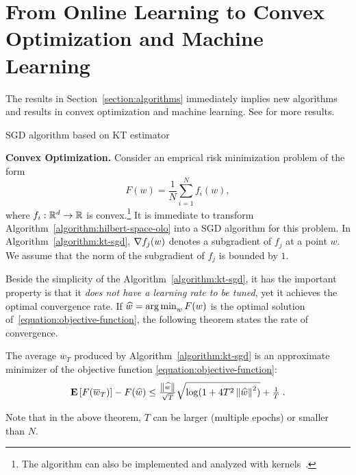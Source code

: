 \section{From Online Learning to Convex Optimization and Machine Learning}
\label{section:applications}

The results in Section~\ref{section:algorithms} immediately implies new
algorithms and results in convex optimization and machine learning. See
\cite{Orabona-2014} for more results.

\begin{algorithm}[t]
\caption{SGD algorithm based on KT estimator \label{algorithm:kt-sgd}}
\begin{algorithmic}[1]
{
\ENDFOR
{}
}
\end{algorithmic}
\end{algorithm}

\textbf{Convex Optimization.}
Consider an emprical risk minimization problem of the form
%
\begin{equation}
\label{equation:objective-function}
F(w) = \frac{1}{N} \sum_{i=1}^N f_i(w),
\end{equation}
%
where $f_i:\mathbb{R}^d \to \mathbb{R}$ is convex.\footnote{The algorithm can also be
implemented and analyzed with kernels~\citep{Orabona-2014}.} It is immediate to
transform Algorithm~\ref{algorithm:hilbert-space-olo} into a \ac{SGD} algorithm
for this problem. In Algorithm~\ref{algorithm:kt-sgd}, $\nabla f_j(w)$
denotes a subgradient of $f_j$ at a point $w$.  We assume that the
norm of the subgradient of $f_j$ is bounded by $1$.

Beside the simplicity of the Algorithm~\ref{algorithm:kt-sgd}, it has the
important property is that it \emph{does not have a learning rate to be tuned},
yet it achieves the optimal convergence rate. If $\widehat{w} = \operatorname*{arg\,min}_w F(w)$
is the optimal solution of~\eqref{equation:objective-function}, the following
theorem states the rate of convergence.
%
\begin{theorem}
The average $\overline{w}_T$ produced by Algorithm~\ref{algorithm:kt-sgd} is
an approximate minimizer of the objective function \eqref{equation:objective-function}:
\[
\operatorname*{\mathbf{E}}\left[F(\overline{w}_T)\right] - F(\widehat{w}) \leq \tfrac{\left\|{\widehat{w}}\right\|}{\sqrt{T}} \sqrt{\log(1+4 T^2 \left\|{\widehat{w}}\right\|^2)} +\tfrac{1}{T} \; .
\]
\end{theorem}
%
Note that in the above theorem, $T$ can be larger (multiple epochs) or smaller
than $N$.

